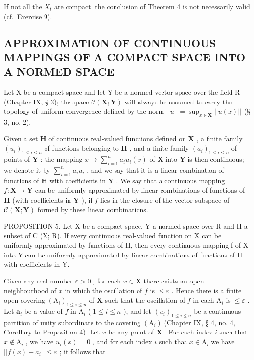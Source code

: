 If not all the \(X_{t}\) are compact, the conclusion of Theorem 4 is not necessarily valid (cf.~Exercise 9).

\subsection{APPROXIMATION OF CONTINUOUS MAPPINGS OF A COMPACT SPACE INTO A NORMED SPACE}

Let X be a compact space and let Y be a normed vector space over the field R (Chapter IX, § 3); the space \(\mathcal{C}(\mathbf{X};\mathbf{Y})\) will always be assumed to carry the topology of uniform convergence defined by the norm \(||u|| = \sup_{x\in \mathbf{X}}||u(x)||\) (§ 3, no. 2).

Given a set \(\mathbf{H}\) of continuous real-valued functions defined on \(\mathbf{X}\) , a finite family \((u_i)_{1\leqslant i\leqslant n}\) of functions belonging to \(\mathbf{H}\) , and a finite family \((a_i)_{1\leqslant i\leqslant n}\) of points of \(\mathbf{Y}\) : the mapping \(x\to \sum_{i = 1}^{n}a_iu_i(x)\) of \(\mathbf{X}\) into \(\mathbf{Y}\) is then continuous; we denote it by \(\sum_{i = 1}^{n}a_iu_i\) , and we say that it is a linear combination of functions of \(\mathbf{H}\) with coefficients in \(\mathbf{Y}\) . We say that a continuous mapping \(f:\mathbf{X}\rightarrow \mathbf{Y}\) can be uniformly approximated by linear combinations of functions of \(\mathbf{H}\) (with coefficients in \(\mathbf{Y}\) ), if \(f\) lies in the closure of the vector subspace of \(\mathcal{C}(\mathbf{X};\mathbf{Y})\) formed by these linear combinations.

PROPOSITION 5. Let X be a compact space, Y a normed space over R and H a subset of C (X; R). If every continuous real-valued function on X can be uniformly approximated by functions of H, then every continuous mapping f of X into Y can be uniformly approximated by linear combinations of functions of H with coefficients in Y.

Given any real number \(\varepsilon > 0\) , for each \(x \in \mathbf{X}\) there exists an open neighbourhood of \(x\) in which the oscillation of \(f\) is \(\leqslant \varepsilon\) . Hence there is a finite open covering \((\mathrm{A}_i)_{1 \leqslant i \leqslant n}\) of \(\mathbf{X}\) such that the oscillation of \(f\) in each \(\mathrm{A}_i\) is \(\leqslant \varepsilon\) . Let \(\boldsymbol{a}_i\) be a value of \(f\) in \(\mathrm{A}_i\) ( \(1 \leqslant i \leqslant n\) ), and let \((u_i)_{1 \leqslant i \leqslant n}\) be a continuous partition of unity subordinate to the covering \((\mathrm{A}_i)\) (Chapter IX, § 4, no. 4, Corollary to Proposition 4). Let \(x\) be any point of \(\mathbf{X}\) . For each index \(i\) such that \(x \notin \mathrm{A}_i\) , we have \(u_i(x) = 0\) , and for each index \(i\) such that \(x \in \mathrm{A}_i\) we have \(||f(x) - a_i|| \leqslant \varepsilon\) ; it follows that


